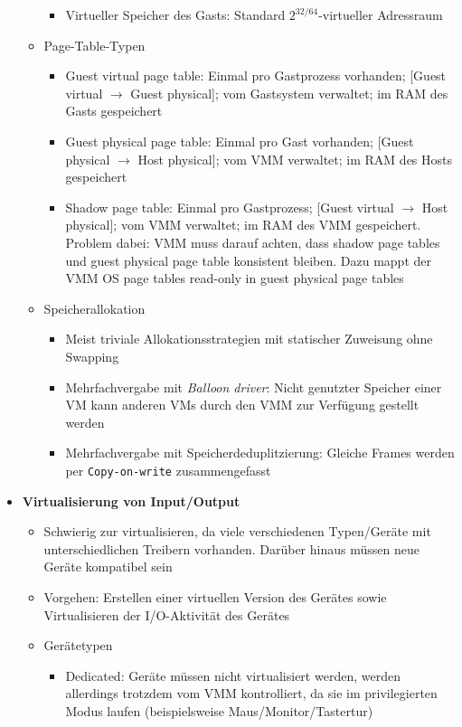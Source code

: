 \begin{itemize}
\begin{itemize}
\begin{itemize}
			\item Virtueller Speicher des Gasts: Standard \(2^{32/64}\)-virtueller Adressraum
		\end{itemize}
		\item Page-Table-Typen
		\begin{itemize}
			\item Guest virtual page table: Einmal pro Gastprozess vorhanden; [Guest virtual \(\rightarrow\) Guest physical]; vom Gastsystem verwaltet; im RAM des Gasts gespeichert
			\item Guest physical page table: Einmal pro Gast vorhanden; [Guest physical \(\rightarrow\) Host physical]; vom VMM verwaltet; im RAM des Hosts gespeichert
			\item Shadow page table: Einmal pro Gastprozess; [Guest virtual \(\rightarrow\) Host physical]; vom VMM verwaltet; im RAM des VMM gespeichert. Problem dabei: VMM muss darauf achten, dass shadow page tables und guest physical page table konsistent bleiben. Dazu mappt der VMM OS page tables read-only in guest physical page tables
		\end{itemize}
		\item Speicherallokation
		\begin{itemize}
			\item Meist triviale Allokationsstrategien mit statischer Zuweisung ohne Swapping
			\item Mehrfachvergabe mit \textit{Balloon driver}: Nicht genutzter Speicher einer VM kann anderen VMs durch den VMM zur Verfügung gestellt werden
			\item Mehrfachvergabe mit Speicherdeduplitzierung: Gleiche Frames werden per \texttt{Copy-on-write} zusammengefasst
		\end{itemize}
	\end{itemize}
	\item \textbf{Virtualisierung von Input/Output}
	\begin{itemize}
		\item Schwierig zur virtualisieren, da viele verschiedenen Typen/Geräte mit unterschiedlichen Treibern vorhanden. Darüber hinaus müssen neue Geräte kompatibel sein
		\item Vorgehen: Erstellen einer virtuellen Version des Gerätes sowie Virtualisieren der I/O-Aktivität des Gerätes
		\item Gerätetypen
		\begin{itemize}
			\item Dedicated: Geräte müssen nicht virtualisiert werden, werden allerdings trotzdem vom VMM kontrolliert, da sie im privilegierten Modus laufen (beispielsweise Maus/Monitor/Tastertur)

\end{itemize}
\end{itemize}
\end{itemize}
